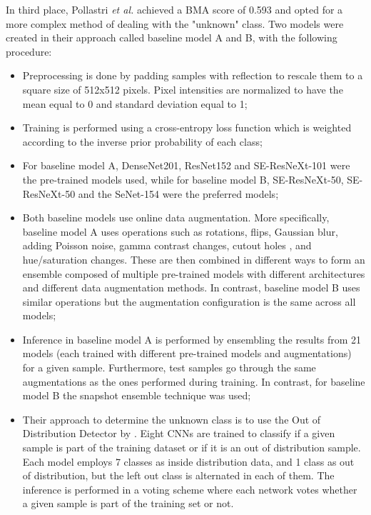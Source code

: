     In third place, Pollastri \textit{et al.} \cite{isic2019third} achieved a \ac{BMA} score of 0.593 and opted for a more complex method of dealing with the "unknown" class. Two models were created in their approach called baseline model A and B, with the following procedure:
    \begin{itemize}
        \item Preprocessing is done by padding samples with reflection to rescale them to a square size of 512x512 pixels. Pixel intensities are normalized to have the mean equal to 0 and standard deviation equal to 1;
        
        \item Training is performed using a cross-entropy loss function which is weighted according to the inverse prior probability of each class;
        
        \item For baseline model A, DenseNet201, ResNet152 and SE-ResNeXt-101 were the pre-trained models used, while for baseline model B, SE-ResNeXt-50, SE-ResNeXt-50 and the SeNet-154 were the preferred models;
        
        \item Both baseline models use online data augmentation. More specifically, baseline model A uses operations such as rotations, flips, Gaussian blur, adding Poisson noise, gamma contrast changes, cutout holes \cite{cutout}, and hue/saturation changes. These are then combined in different ways to form an ensemble composed of multiple pre-trained models with different architectures and different data augmentation methods. In contrast, baseline model B uses similar operations but the augmentation configuration is the same across all models;
        
        \item Inference in baseline model A is performed by ensembling the results from 21 models (each trained with different pre-trained models and augmentations) for a given sample. Furthermore, test samples go through the same augmentations as the ones performed during training. In contrast, for baseline model B the snapshot ensemble technique \cite{snapshot} was used;
        
        \item Their approach to determine the unknown class is to use the Out of Distribution Detector by \cite{Vyas2018}. Eight \ac{CNN}s are trained to classify if a given sample is part of the training dataset or if it is an out of distribution sample. Each model employs 7 classes as inside distribution data, and 1 class as out of distribution, but the left out class is alternated in each of them. The inference is performed in a voting scheme where each network votes whether a given sample is part of the training set or not.
    \end{itemize}


